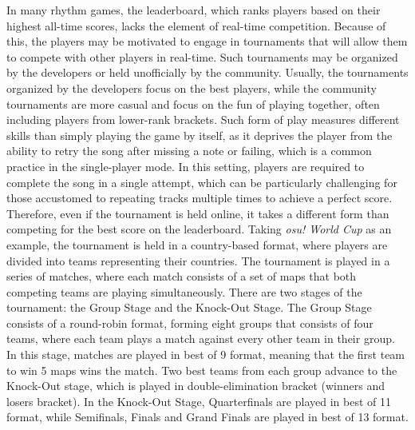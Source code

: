 In many rhythm games, the leaderboard, which ranks players based on their highest all-time scores, lacks the element of real-time competition. Because of this, the players may be motivated to engage in tournaments that will allow them to compete with other players in real-time. Such tournaments may be organized by the developers or held unofficially by the community. Usually, the tournaments organized by the developers focus on the best players, while the community tournaments are more casual and focus on the fun of playing together, often including players from lower-rank brackets. Such form of play measures different skills than simply playing the game by itself, as it deprives the player from the ability to retry the song after missing a note or failing, which is a common practice in the single-player mode. In this setting, players are required to complete the song in a single attempt, which can be particularly challenging for those accustomed to repeating tracks multiple times to achieve a perfect score. Therefore, even if the tournament is held online, it takes a different form than competing for the best score on the leaderboard.
Taking \textit{osu! World Cup} as an example, the tournament is held in a country-based format, where players are divided into teams representing their countries. The tournament is played in a series of matches, where each match consists of a set of maps that both competing teams are playing simultaneously. There are two stages of the tournament: the Group Stage and the Knock-Out Stage. The Group Stage consists of a round-robin format, forming eight groups that consists of four teams, where each team plays a match against every other team in their group. In this stage, matches are played in best of 9 format, meaning that the first team to win 5 maps wins the match. Two best teams from each group advance to the Knock-Out stage, which is played in double-elimination bracket (winners and losers bracket). In the Knock-Out Stage, Quarterfinals are played in best of 11 format, while Semifinals, Finals and Grand Finals are played in best of 13 format.

